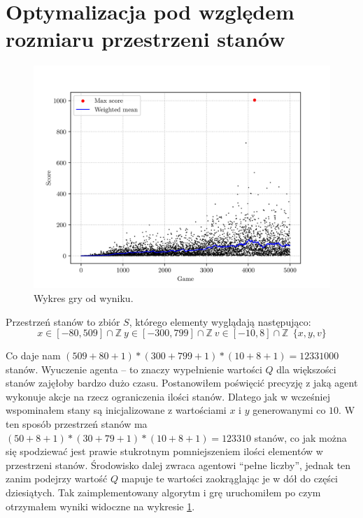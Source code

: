 \documentclass[a4paper, 12pt,oneside]{book}
\begin{document}
\section{Optymalizacja pod względem rozmiaru przestrzeni stanów}
\begin{figure}[!htb]
	\begin{center}
		\includegraphics{plotFirstApproach.png}
	\end{center}
	\caption{Wykres gry od wyniku.}
	\label{plot_first_approach}
\end{figure}

Przestrzeń stanów to zbiór $S$, którego elementy wyglądają następująco:
\[x \in [-80, 509] \cap \mathbb{Z} \ y \in [-300,799] \cap
\mathbb{Z} \ v \in [-10,8] \cap \mathbb{Z}\ \  \{x, y, v\}\]

Co daje nam $(509 + 80 + 1) * (300 + 799 + 1) * (10 + 8 +1) = 12 331 000$
stanów. Wyuczenie agenta -- to znaczy wypełnienie wartości $Q$ dla większości
stanów zajęłoby bardzo dużo czasu. Postanowiłem poświęcić precyzję z jaką agent
wykonuje akcje na rzecz ograniczenia ilości stanów. Dlatego jak w wcześniej
wspominałem stany są inicjalizowane z wartościami $x$ i $y$ generowanymi co
$10$. W ten sposób przestrzeń stanów ma $(50 + 8 + 1) * (30 + 79 + 1) * (10 + 8
+ 1) = 123 310$ stanów, co jak można się spodziewać jest prawie stukrotnym
pomniejszeniem ilości elementów w przestrzeni stanów. Środowisko dalej zwraca
agentowi ``pełne liczby'', jednak ten zanim podejrzy wartość $Q$ mapuje te
wartości zaokrąglając je w dół do części dziesiątych.
Tak zaimplementowany algorytm i grę uruchomiłem po czym otrzymałem wyniki
widoczne na wykresie \ref{plot_first_approach}.
\end{document}
